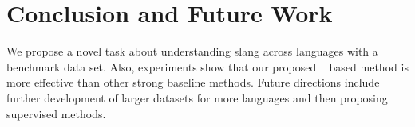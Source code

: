 \vspace{-5pt}
\section{Conclusion and Future Work} 
We propose a novel task about understanding slang across languages with a benchmark data set. Also, experiments show that our proposed \socvec~ based method is more effective than other strong baseline methods. 
Future directions include further development of larger datasets for more languages and then proposing supervised methods.

